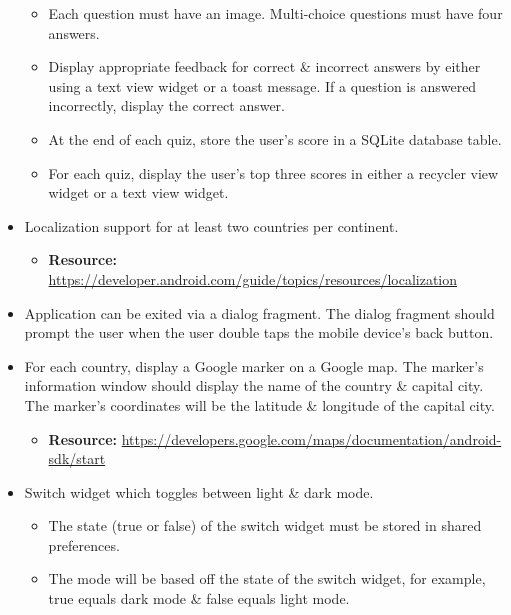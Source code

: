 \documentclass{article}
\begin{document}
\begin{itemize}
\begin{itemize}
        \item Each question must have an image. Multi-choice questions must have four answers.
        \item Display appropriate feedback for correct \& incorrect answers by either using a text view widget or a toast message. If a question is answered incorrectly, display the correct answer.
        \item At the end of each quiz, store the user's score in a SQLite database table. 
        \item For each quiz, display the user's top three scores in either a recycler view widget or a text view widget.
    \end{itemize}
    \item Localization support for at least two countries per continent.  
    \begin{itemize}
        \item \textbf{Resource:} \footnotesize\href{https://developer.android.com/guide/topics/resources/localization/}{https://developer.android.com/guide/topics/resources/localization}
    \end{itemize}
    \item Application can be exited via a dialog fragment. The dialog fragment should prompt the user when the user double taps the mobile device's back button.
    \item For each country, display a Google marker on a Google map. The marker's information window should display the name of the country \& capital city. The marker's coordinates will be the latitude \& longitude of the capital city.
    \begin{itemize}
        \item \textbf{Resource:} \footnotesize\href{https://developers.google.com/maps/documentation/android-sdk/start}{https://developers.google.com/maps/documentation/android-sdk/start}
    \end{itemize}
    \item Switch widget which toggles between light \& dark mode. 
    \begin{itemize}
        \item The state (true or false) of the switch widget must be stored in shared preferences.
        \item The mode will be based off the state of the switch widget, for example, true equals dark mode \& false equals light mode.
    \end{itemize}
    \begin{itemize}

\end{itemize}
\end{itemize}
\end{document}
